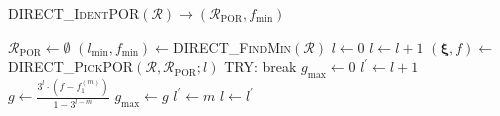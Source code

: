 ﻿\documentclass{jsarticle}
\begin{document}
\setcounter{algorithm}{2}
\begin{algorithm}[tbh]
\caption{\textsc{DIRECT\_IdentPOR}$(\mathcal{R})\rightarrow(\mathcal{R}_{\mathrm{POR}},f_{\mathrm{min}})$}
\label{alg:direct_ident_por}
\begin{algorithmic}[1]
\State $\mathcal{R}_{\mathrm{POR}}\leftarrow\emptyset$
\State $(l_{\mathrm{min}},f_{\mathrm{min}})\leftarrow$\textsc{DIRECT\_FindMin}$(\mathcal{R})$
  \State {}
\EndIf
\State $l\leftarrow 0$
  \State $l\leftarrow l+1$
\EndWhile
{}
  \State $(\bm{\xi},f)\leftarrow$\textsc{DIRECT\_PickPOR}$(\mathcal{R},\mathcal{R}_{\mathrm{POR}};l)$
  \State TRY:
    \State break
  \EndIf
  \State $g_{\mathrm{max}}\leftarrow 0$
  \State $l^{\prime}\leftarrow l+1$
      \State $g\leftarrow\frac{3^{l}\cdot(f-f^{(m)}_{1})}{1-3^{l-m}}$
        \State $g_{\mathrm{max}}\leftarrow g$
        \State $l^{\prime}\leftarrow m$
      \EndIf
    \EndIf
  \EndFor
  \State $l\leftarrow l^{\prime}$
\EndWhile
\State {}
\end{algorithmic}
\end{algorithm}
\end{document}
